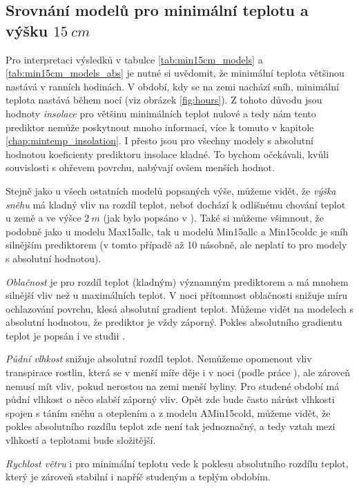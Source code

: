 \subsection{Srovnání modelů pro minimální teplotu a výšku $\SI{15}{cm}$}
Pro interpretaci výsledků v tabulce \ref{tab:min15cm_models} a \ref{tab:min15cm_models_abs} je nutné si uvědomit, že minimální teplota většinou nastává v ranních hodinách. V období, kdy se na zemi nachází sníh, minimální teplota nastává během nocí (viz obrázek \ref{fig:hours}). Z tohoto důvodu jsou hodnoty \textit{insolace} pro většinu minimálních teplot nulové a tedy nám tento prediktor nemůže poskytnout mnoho informací, více k tomuto v kapitole \ref{chap:mintemp_insolation}. I přesto jsou pro všechny modely s absolutní hodnotou koeficienty prediktoru insolace kladné. To bychom očekávali, kvůli souvislosti s ohřevem povrchu, nabývají ovšem menších hodnot.

Stejně jako u všech ostatních modelů popsaných výše, můžeme vidět, že \textit{výška sněhu} má kladný vliv na rozdíl teplot, neboť dochází k odlišnému chování teplot u země a ve výšce $\SI{2}{m}$ (jak bylo popsáno v \parencite{snow_deFrenneForestMicroclimates}). Také si můžeme všimnout, že podobně jako u modelu Max15allc, tak u modelů Min15allc a Min15coldc je sníh silnějším prediktorem (v tomto případě až 10 násobně, ale neplatí to pro modely s absolutní hodnotou). 

\textit{Oblačnost} je pro rozdíl teplot (kladným) významným prediktorem a má mnohem silnější vliv než u maximálních teplot. V noci přítomnost oblačnosti snižuje míru ochlazování povrchu, klesá absolutní gradient teplot. Můžeme vidět na modelech s absolutní hodnotou, že prediktor je vždy záporný. Pokles absolutního gradientu teplot je popsán i ve studii \parencite{cloud_overwinteringclusters}. 

\textit{Půdní vlhkost} snižuje absolutní rozdíl teplot. Nemůžeme opomenout vliv transpirace rostlin, která se v menší míře děje i v noci (podle práce \parencite{nighttranspiration}), ale zároveň nemusí mít vliv, pokud nerostou na zemi menší byliny. Pro studené období má půdní vlhkost o něco slabší záporný vliv. Opět zde bude často nárůst vlhkosti spojen s táním sněhu a oteplením a z modelu AMin15cold, můžeme vidět, že pokles absolutního rozdílu teplot zde není tak jednoznačný, a tedy vztah mezi vlhkostí a teplotami bude složitější.

\textit{Rychlost větru} i pro minimální teplotu vede k poklesu absolutního rozdílu teplot, který je zároveň stabilní i napříč studeným a teplým obdobím.

